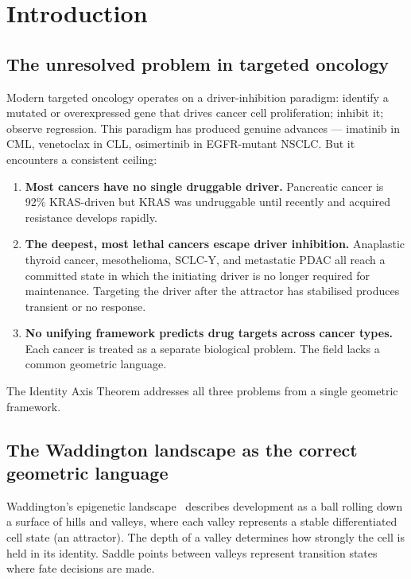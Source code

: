 \documentclass[11pt, a4paper]{article}
\begin{document}
\tableofcontents
\newpage

\section{Introduction}
\label{sec:introduction}

\subsection{The unresolved problem in targeted oncology}

Modern targeted oncology operates on a driver-inhibition
paradigm: identify a mutated or overexpressed gene that
drives cancer cell proliferation; inhibit it; observe
regression. This paradigm has produced genuine advances
--- imatinib in CML, venetoclax in CLL, osimertinib in
EGFR-mutant NSCLC. But it encounters a consistent ceiling:

\begin{enumerate}
    \item \textbf{Most cancers have no single druggable
    driver.} Pancreatic cancer is 92\% KRAS-driven but
    KRAS was undruggable until recently and acquired
    resistance develops rapidly.
    \item \textbf{The deepest, most lethal cancers escape
    driver inhibition.} Anaplastic thyroid cancer,
    mesothelioma, SCLC-Y, and metastatic PDAC all reach
    a committed state in which the initiating driver is
    no longer required for maintenance. Targeting the
    driver after the attractor has stabilised produces
    transient or no response.
    \item \textbf{No unifying framework predicts drug
    targets across cancer types.} Each cancer is treated
    as a separate biological problem. The field lacks
    a common geometric language.
\end{enumerate}

The Identity Axis Theorem addresses all three problems
from a single geometric framework.

\subsection{The Waddington landscape as the correct
geometric language}

Waddington's epigenetic landscape~\cite{waddington1957}
describes development as a ball rolling down a surface
of hills and valleys, where each valley represents a
stable differentiated cell state (an attractor). The
depth of a valley determines how strongly the cell
is held in its identity. Saddle points between valleys
represent transition states where fate decisions are made.
\end{document}
